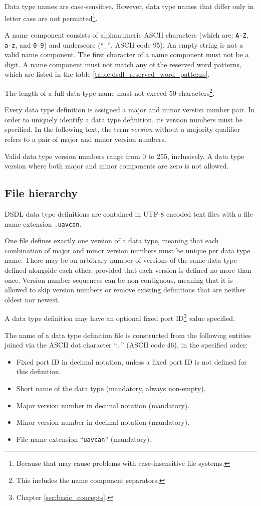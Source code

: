 Data type names are case-sensitive.
However, data type names that differ only in letter case are not permitted\footnote{%
Because that may cause problems with case-insensitive file systems.}.

A name component consists of alphanumeric ASCII characters (which are: \verb|A-Z|, \verb|a-z|, and \verb|0-9|)
and underscore (``\verb|_|'', ASCII code 95).
An empty string is not a valid name component.
The first character of a name component must not be a digit.
A name component must not match any of the reserved word patterns,
which are listed in the table \ref{table:dsdl_reserved_word_patterns}.

The length of a full data type name must not exceed 50
characters\footnote{This includes the name component separators.}.

Every data type definition is assigned a major and minor version number pair.
In order to uniquely identify a data type definition, its version numbers must be specified.
In the following text, the term \emph{version} without a majority qualifier refers to
a pair of major and minor version numbers.

Valid data type version numbers range from 0 to 255, inclusively.
A data type version where both major and minor components are zero is not allowed.

\subsection{File hierarchy}

DSDL data type definitions are contained in UTF-8 encoded text files with a file name extension \verb|.uavcan|.

One file defines exactly one version of a data type,
meaning that each combination of major and minor version numbers must be unique per data type name.
There may be an arbitrary number of versions of the same data type defined alongside each other,
provided that each version is defined no more than once.
Version number sequences can be non-contiguous,
meaning that it is allowed to skip version numbers or remove existing definitions that are neither oldest nor newest.

A data type definition may have an optional fixed port ID\footnote{Chapter \ref{sec:basic_concepts}.} value specified.

The name of a data type definition file is constructed from the following entities
joined via the ASCII dot character ``\verb|.|'' (ASCII code 46), in the specified order:
\begin{itemize}
    \item Fixed port ID in decimal notation, unless a fixed port ID is not defined for this definition.
    \item Short name of the data type (mandatory, always non-empty).
    \item Major version number in decimal notation (mandatory).
    \item Minor version number in decimal notation (mandatory).
    \item File name extension ``\verb|uavcan|'' (mandatory).
\end{itemize}


